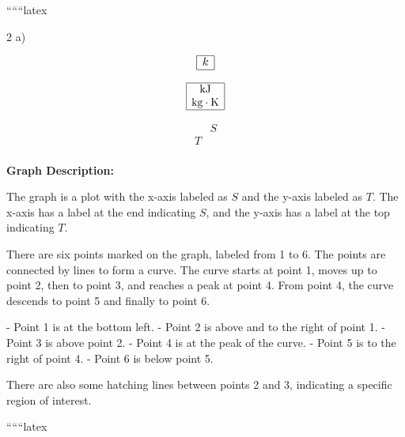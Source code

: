 
``````latex


2 \quad a)

\[
\begin{array}{|c|}
\hline
k \\
\hline
\end{array}
\]

\[
\begin{array}{|c|}
\hline
\text{kJ} \\
\text{kg} \cdot \text{K} \\
\hline
\end{array}
\]

\[
\begin{array}{c|c}
 & S \\
\hline
T & \\
\end{array}
\]

\textbf{Graph Description:}

The graph is a plot with the x-axis labeled as \( S \) and the y-axis labeled as \( T \). The x-axis has a label at the end indicating \( S \), and the y-axis has a label at the top indicating \( T \). 

There are six points marked on the graph, labeled from 1 to 6. The points are connected by lines to form a curve. The curve starts at point 1, moves up to point 2, then to point 3, and reaches a peak at point 4. From point 4, the curve descends to point 5 and finally to point 6.

- Point 1 is at the bottom left.
- Point 2 is above and to the right of point 1.
- Point 3 is above point 2.
- Point 4 is at the peak of the curve.
- Point 5 is to the right of point 4.
- Point 6 is below point 5.

There are also some hatching lines between points 2 and 3, indicating a specific region of interest.

``````latex


